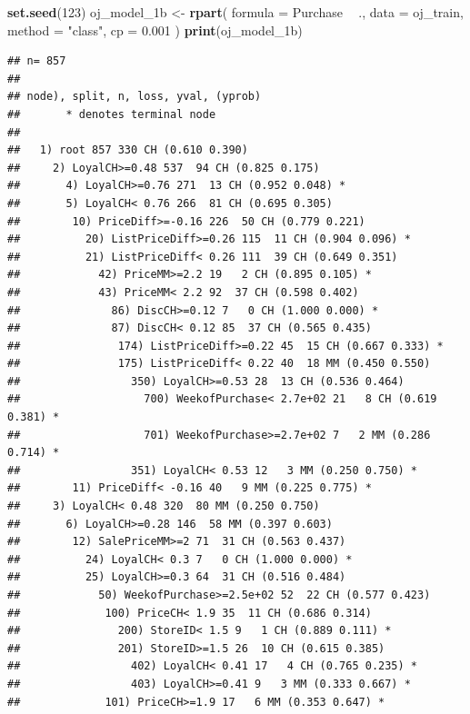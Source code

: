 \documentclass[
]{book}
\newenvironment{Shaded}{\begin{snugshade}}{\end{snugshade}}
\newcommand{\DataTypeTok}[1]{\textcolor[rgb]{0.13,0.29,0.53}{#1}}
\newcommand{\DecValTok}[1]{\textcolor[rgb]{0.00,0.00,0.81}{#1}}
\newcommand{\FloatTok}[1]{\textcolor[rgb]{0.00,0.00,0.81}{#1}}
\newcommand{\KeywordTok}[1]{\textcolor[rgb]{0.13,0.29,0.53}{\textbf{#1}}}
\newcommand{\NormalTok}[1]{#1}
\newcommand{\OperatorTok}[1]{\textcolor[rgb]{0.81,0.36,0.00}{\textbf{#1}}}
\newcommand{\StringTok}[1]{\textcolor[rgb]{0.31,0.60,0.02}{#1}}
\begin{document}
\begin{Shaded}
\begin{Highlighting}[]
\KeywordTok{set.seed}\NormalTok{(}\DecValTok{123}\NormalTok{)}
\NormalTok{oj_model_1b <-}\StringTok{ }\KeywordTok{rpart}\NormalTok{(}
   \DataTypeTok{formula =}\NormalTok{ Purchase }\OperatorTok{~}\StringTok{ }\NormalTok{.,}
   \DataTypeTok{data =}\NormalTok{ oj_train,}
   \DataTypeTok{method =} \StringTok{"class"}\NormalTok{,}
   \DataTypeTok{cp =} \FloatTok{0.001}
\NormalTok{   )}
\KeywordTok{print}\NormalTok{(oj_model_1b)}
\end{Highlighting}
\end{Shaded}

\begin{verbatim}
## n= 857 
## 
## node), split, n, loss, yval, (yprob)
##       * denotes terminal node
## 
##   1) root 857 330 CH (0.610 0.390)  
##     2) LoyalCH>=0.48 537  94 CH (0.825 0.175)  
##       4) LoyalCH>=0.76 271  13 CH (0.952 0.048) *
##       5) LoyalCH< 0.76 266  81 CH (0.695 0.305)  
##        10) PriceDiff>=-0.16 226  50 CH (0.779 0.221)  
##          20) ListPriceDiff>=0.26 115  11 CH (0.904 0.096) *
##          21) ListPriceDiff< 0.26 111  39 CH (0.649 0.351)  
##            42) PriceMM>=2.2 19   2 CH (0.895 0.105) *
##            43) PriceMM< 2.2 92  37 CH (0.598 0.402)  
##              86) DiscCH>=0.12 7   0 CH (1.000 0.000) *
##              87) DiscCH< 0.12 85  37 CH (0.565 0.435)  
##               174) ListPriceDiff>=0.22 45  15 CH (0.667 0.333) *
##               175) ListPriceDiff< 0.22 40  18 MM (0.450 0.550)  
##                 350) LoyalCH>=0.53 28  13 CH (0.536 0.464)  
##                   700) WeekofPurchase< 2.7e+02 21   8 CH (0.619 0.381) *
##                   701) WeekofPurchase>=2.7e+02 7   2 MM (0.286 0.714) *
##                 351) LoyalCH< 0.53 12   3 MM (0.250 0.750) *
##        11) PriceDiff< -0.16 40   9 MM (0.225 0.775) *
##     3) LoyalCH< 0.48 320  80 MM (0.250 0.750)  
##       6) LoyalCH>=0.28 146  58 MM (0.397 0.603)  
##        12) SalePriceMM>=2 71  31 CH (0.563 0.437)  
##          24) LoyalCH< 0.3 7   0 CH (1.000 0.000) *
##          25) LoyalCH>=0.3 64  31 CH (0.516 0.484)  
##            50) WeekofPurchase>=2.5e+02 52  22 CH (0.577 0.423)  
##             100) PriceCH< 1.9 35  11 CH (0.686 0.314)  
##               200) StoreID< 1.5 9   1 CH (0.889 0.111) *
##               201) StoreID>=1.5 26  10 CH (0.615 0.385)  
##                 402) LoyalCH< 0.41 17   4 CH (0.765 0.235) *
##                 403) LoyalCH>=0.41 9   3 MM (0.333 0.667) *
##             101) PriceCH>=1.9 17   6 MM (0.353 0.647) *

\end{verbatim}
\end{document}
